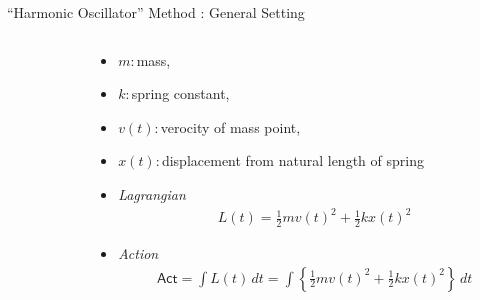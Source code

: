 \documentclass[aspectratio=169, bigfiles]{beamer}
\begin{document}
\begin{frame}{``Harmonic Oscillator'' Method : General Setting}
\begin{columns}[t]
\begin{column}{0.5\textwidth}
\begin{small}
\begin{center}
\begin{tikzpicture}[black!75]
	\end{tikzpicture}
    \end{center}
\end{small}
\end{column}
\begin{column}{0.5\textwidth} 
\vspace{-3mm}
\begin{itemize}
    \item
    $m:$mass,
    \item
    $k:$spring constant,
    \item
    $v(t):$verocity of mass point,
    \item
    $x(t):$displacement from natural length of spring
    \item
    \emph{Lagrangian}
    \vspace{-3mm}
    \begin{align*}
        L(t) = \frac{1}{2}mv(t)^{2}+\frac{1}{2}kx(t)^{2}
    \end{align*}
    \item
    \emph{Action}
    \vspace{-3mm}
    \begin{align*}
        \mathsf{Act} = \int L(t)\,dt = \int\left\{\frac{1}{2}mv(t)^{2}+\frac{1}{2}kx(t)^{2}\right\}\,dt
    \end{align*}
\end{itemize}
\end{column}
\end{columns}
\end{frame}
\end{document}
